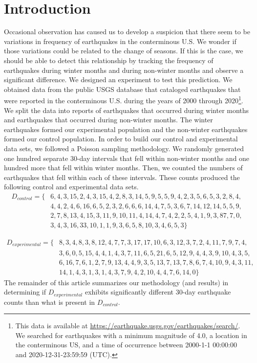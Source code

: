 \documentclass{amsart}
\begin{document}
\section{Introduction}\label{S:Introduction}
Occasional observation has caused us to develop a suspicion that there seem to be variations in frequency of earthquakes in the conterminous U.S. We wonder if those variations could be related to the change of seasons. If this is the case, we should be able to detect this relationship by tracking the frequency of earthquakes during winter months and during non-winter months and observe a significant difference. We designed an experiment to test this prediction. We obtained data from the public USGS database that cataloged earthquakes that were reported in the conterminous U.S. during the years of 2000 through 2020\footnote{This data is available at \url{https://earthquake.usgs.gov/earthquakes/search/}. We searched for earthquakes with a minimum magnitude of 4.0, a location in the conterminous US, and a time of  occurrence between 2000-1-1 00:00:00 and 2020-12-31-23:59:59 (UTC).}. We split the data into reports of earthquakes that occurred during winter months and earthquakes that occurred during non-winter months. The winter earthquakes formed our experimental population and the non-winter earthquakes formed our control population. In order to build our control and experimental data sets, we followed a Poisson sampling methodology. We randomly generated one hundred separate 30-day intervals that fell within non-winter months and one hundred more that fell within winter months. Then, we counted the numbers of earthquakes that fell within each of these intervals. These counts produced the following control and experimental data sets.
\begin{align*}
D_{control}=\{&6, 4, 3, 15, 2, 4, 3, 15, 4, 2, 8, 3, 14, 5, 9, 5, 5, 9, 4, 2, 3, 5, 6, 5, 3, 2, 8, 4,\\ 
&4, 4, 2, 4, 6, 16, 6, 5, 2, 3, 2, 6, 6, 6, 14, 4, 7, 5, 3, 6, 7, 14, 12, 14, 5, 5, 9,\\
&2, 7, 8, 13, 4, 15, 3, 11, 9, 10, 11, 4, 14, 4, 7, 4, 2, 2, 5, 4, 1, 9, 3, 87, 7, 0,\\
&3, 4, 3, 16, 33, 10, 1, 1, 9, 3, 6, 5, 8, 10, 3, 4, 6, 5, 3\}
\end{align*}

\begin{align*}
D_{experimental}=\{&8, 3, 4, 8, 3, 8, 12, 4, 7, 7, 3, 17, 17, 10, 6, 3, 12, 3, 7, 2, 4, 11, 7, 9, 7, 4,\\
&3, 6, 0, 5, 15, 4, 4, 1, 4, 3, 7, 11, 6, 5, 21, 6, 5, 12, 9, 4, 4, 3, 9, 10, 4, 3, 5,\\ 
&6, 16, 7, 6, 1, 2, 7, 9, 13, 4, 4, 9, 3, 5, 13, 7, 13, 7, 8, 6, 7, 4, 10, 9, 4, 3, 11,\\
&14, 1, 4, 3, 1, 3, 1, 4, 3, 7, 9, 4, 2, 10, 4, 4, 7, 6, 14, 0\}
\end{align*}
The remainder of this article summarizes our methodology (and results) in determining if $D_{experimental}$ exhibits significantly different 30-day earthquake counts than what is present in $D_{control}$.
\end{document}
